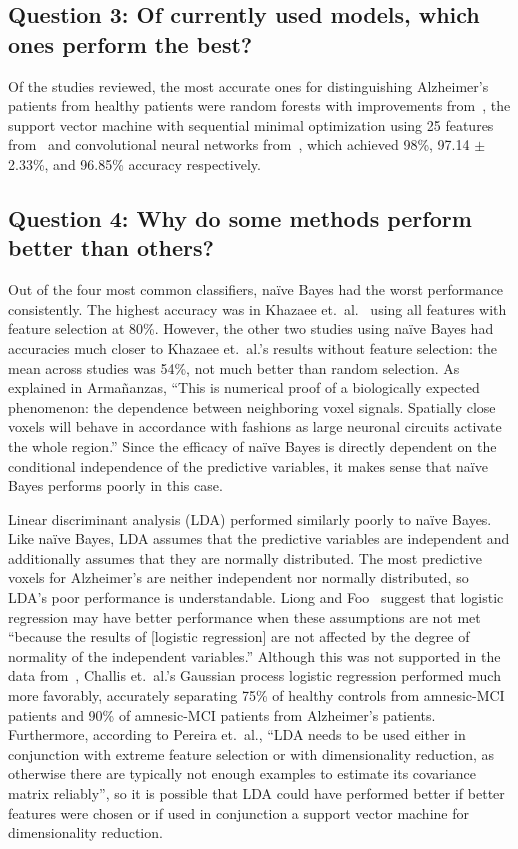 \documentclass[pageno]{jpaper}
\begin{document}
\subsection{Question 3: Of currently used models, which ones perform the best?}
\label{sub:Question 3: Of currently used models, which ones perform the best?}
Of the studies reviewed, the most accurate ones for distinguishing Alzheimer's
patients from healthy patients were random forests with improvements from~\cite{Tripoliti2010}, 
the support vector machine with sequential minimal optimization using 25 features 
from~\cite{Armananzas2016} and convolutional neural networks from~\cite{Sarraf2016}, 
which achieved 98\%, 97.14 $\pm$ 2.33\%, and 96.85\% accuracy respectively. 

\subsection{Question 4: Why do some methods perform better than others?}
\label{sub:Question 4: Why do some methods perform better than others?}
Out of the four most common classifiers, naïve Bayes had the worst performance 
consistently. The highest accuracy was in Khazaee et.\ al.~\cite{Khazaee2015}
using all features with feature selection at 80\%. However, the other two studies 
using naïve Bayes had accuracies much closer to Khazaee et.\ al.'s results without 
feature selection: the mean across studies was 54\%, not much better than random 
selection. As explained in Armañanzas, ``This is numerical proof of a biologically
expected phenomenon: the dependence between neighboring voxel signals. Spatially
close voxels will behave in accordance with fashions as large neuronal circuits
activate the whole region.'' Since the efficacy of naïve Bayes is directly 
dependent on the conditional independence of the predictive variables, it makes 
sense that naïve Bayes performs poorly in this case\cite{Armananzas2016}.

Linear discriminant analysis (LDA) performed similarly poorly to naïve Bayes. Like 
naïve Bayes, LDA assumes that the predictive variables are independent and 
additionally assumes that they are normally distributed. The most predictive voxels
for Alzheimer's are neither independent nor normally distributed, so LDA's poor 
performance is understandable. Liong and Foo~\cite{Liong2013} suggest that logistic
regression may have better performance when these assumptions are not met 
``because the results of [logistic regression] are not affected by the degree of 
normality of the independent variables.'' Although this was not supported in the 
data from~\cite{Honorio2012}, Challis et.\ al.'s Gaussian process logistic 
regression performed much more favorably, accurately separating 75\% of healthy 
controls from amnesic-MCI patients and 90\% of amnesic-MCI patients from 
Alzheimer's patients. Furthermore, according to Pereira et.\ al., ``LDA needs to be 
used either in conjunction with extreme feature selection or with dimensionality 
reduction, as otherwise there are typically not enough examples to estimate its 
covariance matrix reliably''\cite{Pereira2009}, so it is possible that LDA could 
have performed better if better features were chosen or if used in conjunction 
a support vector machine for dimensionality reduction.
\end{document}
